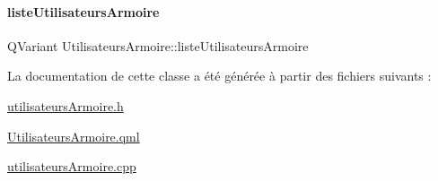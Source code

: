 \mbox{\label{class_utilisateurs_armoire_a8ba4ea6592f6588ab1cd0ddce7dc744d}} 
\paragraph{\texorpdfstring{liste\+Utilisateurs\+Armoire}{listeUtilisateursArmoire}}
{\footnotesize\ttfamily Q\+Variant Utilisateurs\+Armoire\+::liste\+Utilisateurs\+Armoire\hspace{0.3cm}{\ttfamily [read]}}



La documentation de cette classe a été générée à partir des fichiers suivants \+:\begin{DoxyCompactItemize}
\item 
\hyperlink{utilisateurs_armoire_8h}{utilisateurs\+Armoire.\+h}\item 
\hyperlink{_utilisateurs_armoire_8qml}{Utilisateurs\+Armoire.\+qml}\item 
\hyperlink{utilisateurs_armoire_8cpp}{utilisateurs\+Armoire.\+cpp}\end{DoxyCompactItemize}

